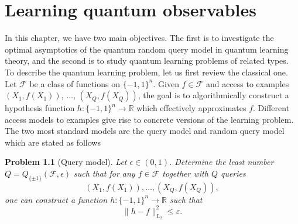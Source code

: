 \documentclass{amsbook}
\newtheorem{problem}[theorem]{Problem}
\theoremstyle{definition}
\theoremstyle{remark}
\numberwithin{section}{chapter}
\numberwithin{equation}{chapter}
\newcommand{\1}{\mathbf{1}}
\begin{document}
\chapter{Learning quantum observables}\label{sec QLT}
In this chapter, we have two main objectives. The first is to investigate the optimal asymptotics of the quantum random query model in quantum learning theory, and the second is to study quantum learning problems of related types.
To describe the quantum learning problem, let us first review the classical one. 
Let $\mathcal{F}$ be a class of functions on $\{-1,1\}^n$.  Given $f\in \mathcal{F}$ and access to examples $(X_1, f(X_1))$, $\dots$, $(X_Q, f(X_Q))$, the goal is to algorithmically construct a hypothesis function $h : \{-1,1\}^n \to \mathbb{R}$ which effectively approximates $f$. Different access models to examples give rise to concrete versions of the learning problem. The two most standard  models are the query model and random query model which are stated as follows
\begin{problem}[Query model] Let $\epsilon\in (0,1)$.  Determine  the least number $Q=Q_{\{\pm1\}}(\mathcal{F},\epsilon)$ such that for any $f\in \mathcal{F}$ together with $Q$ queries
$$(X_1, f(X_1)), \dots, (X_Q, f(X_Q)),$$
 one can construct a function $h: \{-1,1\}^n \to \mathbb{R}$ such that 
$$\|h - f\|_{L_2}^2 \leq \varepsilon.$$
\end{problem}
\end{document}
